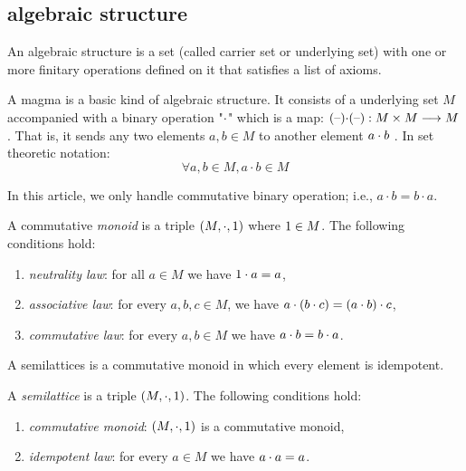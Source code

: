 \subsection{algebraic structure}

An algebraic structure is a set (called carrier set or underlying set) 
with one or more finitary operations defined on it 
that satisfies a list of axioms.

\begin{definition} [magma]
A magma is a basic kind of algebraic structure. 
It consists of a underlying set $M$ 
accompanied with a binary operation "$\mathbin{\cdot}$" which is a map: 
$ {{(\mbox{\textendash})}} { \mathbin{\cdot}} {{(\mbox{\textendash})}} : M \times M \longrightarrow M$.  That is, it sends any two elements $a,b \in M$ to another element $a \mathbin{\cdot} b$ .
%
In set theoretic notation:
\[ \forall a,b \in M    ,      a \cdot b \in M \]
\end{definition}

In this article, we only handle commutative binary operation; 
i.e., $ a \cdot b = b \cdot a$. 

\begin{definition}
A commutative {\it monoid} is a triple 
$(M,\mathbin{\cdot},\mbox{\boldmath{1}}) $  where $\mbox{\boldmath{1}} \in M$. 
The following conditions hold:
%
\begin{enumerate} 
\item {\em neutrality law}:  for all  $a \in M$  we have $\mbox{\boldmath{1}} \mathbin{\cdot} a = a$,
\item {\em associative law}:  for every $a,b,c \in M$,
we have $a \mathbin{\cdot} ( b \mathbin{\cdot} c) =  (a \mathbin{\cdot} b) \mathbin{\cdot} c$,
\item {\em commutative law}:  for every $a,b \in M$ we have $a \mathbin{\cdot} b = b \mathbin{\cdot} a$.
\end{enumerate}
\end{definition} 
%
A semilattices is a commutative monoid in which every element is idempotent. 
%
\begin{definition}[semilattice]
A {\it semilattice} is a triple $(M,\mathbin{\cdot},\mbox{\boldmath{1}}) $.
The following conditions hold:
%
\begin{enumerate} 
\item {\em commutative monoid}:  $(M,\mathbin{\cdot},\mbox{\boldmath{1}})$ is a commutative monoid,
\item {\em idempotent law}:  for every $a \in M$  we have $a \mathbin{\cdot} a = a$.
\end{enumerate}
\end{definition}

